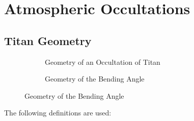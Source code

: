 \documentclass[crop=false,class=article,oneside]{standalone}
\begin{document}
    \ifx\ifresearchnotesosthemathematicsofcassini\undefined
        \section*{Atmospheric Occultations}
        \setcounter{section}{1}
        \renewcommand\thesubfigure{%
            \arabic{section}.\arabic{figure}.\arabic{subfigure}%
        }
    \fi
    \subsection{Titan Geometry}
        \begin{figure}[H]
        	\centering
        	\begin{subfigure}[b]{0.49\textwidth}
        	    \centering
            	\caption{Geometry of an Occultation of Titan}
        	    \label{fig:math_titan_geom_vec}
            \end{subfigure}
            \begin{subfigure}[b]{0.49\textwidth}
                \centering
                \caption{Geometry of the Bending Angle}
                \label{fig:math_geo_bending_angle}
            \end{subfigure}
        \end{figure}
        The following definitions are used:
\end{document}
